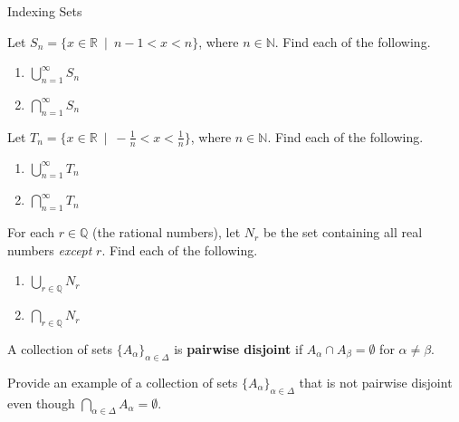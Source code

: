 \begin{section}{Indexing Sets}
\begin{problem}
Let $S_n = \{x \in \mathbb{R} \ \mid  \ n-1<x<n \}$, where $n\in \mathbb{N}$.  Find each of the following.
\begin{multicols}{2}
\begin{enumerate}[label=\textrm{(\alph*)}]
\item $\displaystyle \bigcup_{n=1}^{\infty}S_n$
\item $\displaystyle \bigcap_{n=1}^{\infty}S_n$
\end{enumerate}
\end{multicols}
\end{problem}

\begin{problem}
Let $T_n = \{x \in \mathbb{R} \ \mid  \ -\frac{1}{n}<x< \frac{1}{n} \}$, where $n\in \mathbb{N}$.  Find each of the following.
\begin{multicols}{2}
\begin{enumerate}[label=\textrm{(\alph*)}]
\item $\displaystyle \bigcup_{n=1}^{\infty}T_n$
\item $\displaystyle \bigcap_{n=1}^{\infty}T_n$
\end{enumerate}
\end{multicols}
\end{problem}

\begin{problem}
For each $r\in\mathbb{Q}$ (the rational numbers), let $N_r$ be the set containing all real numbers \emph{except} $r$.  Find each of the following.
\begin{multicols}{2}
\begin{enumerate}[label=\textrm{(\alph*)}]
\item $\displaystyle \bigcup_{r\in\mathbb{Q}}N_r$
\item $\displaystyle \bigcap_{r\in\mathbb{Q}}N_r$
\end{enumerate}
\end{multicols}
\end{problem}

\begin{definition}
A collection of sets $\{A_{\alpha}\}_{\alpha\in\Delta}$ is \textbf{pairwise disjoint} if $A_{\alpha} \cap A_{\beta}=\emptyset$ for $\alpha\neq \beta$.
\end{definition}

\begin{problem}
Provide an example of a collection of sets $\{A_{\alpha}\}_{\alpha\in\Delta}$ that is not pairwise disjoint even though $\bigcap_{\alpha\in\Delta}A_{\alpha}=\emptyset$.
\end{problem}


\end{section}
